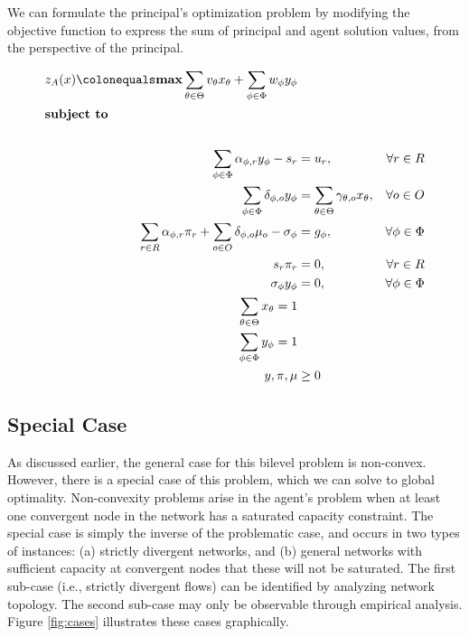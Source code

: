 We can formulate the principal's optimization problem by modifying the objective function to express the sum of principal and agent solution values, from the perspective of the principal.

\begin{align} 
    z_A(x) \colonequals \boldsymbol{\max}  \sum_{\theta \in \Theta} v_{\theta} x_{\theta} + \sum_{\phi \in \Phi} w_{\phi} y_{\phi} \\
    \shortintertext{\textbf{subject to} \nonumber} \\
    \sum_{\phi \in \Phi} \alpha_{\phi,r} y_{\phi}  - s_r  & = u_r, & \forall r \in R \\
    \sum_{\phi \in \Phi} \delta_{\phi,o} y_{\phi} & = \sum_{\theta \in \Theta} \gamma_{\theta,o} x_{\theta} , & \forall o \in O \\
    \sum_{r \in R} \alpha_{\phi,r} \pi_r + \sum_{o \in O} \delta_{\phi,o} \mu_o - \sigma_\phi  & = g_{\phi} , & \forall \phi \in \Phi \\
     s_r \pi_r & = 0 , & \forall r \in R \\
    \sigma_{\phi} y_{\phi} & = 0 , & \forall \phi \in \Phi \\
    \sum_{\theta \in \Theta} x_\theta = 1 \\
    \sum_{\phi \in \Phi} y_\phi = 1 \\
    y, \pi, \mu & \geq 0 
\end{align}

\subsection{Special Case}

As discussed earlier, the general case for this bilevel problem is non-convex. 
However, there is a special case of this problem, which we can solve to global optimality. 
Non-convexity problems arise in the agent's problem when at least one convergent node in the network has a saturated capacity constraint. 
The special case is simply the inverse of the problematic case, and occurs in two types of instances: (a) strictly divergent networks, and (b) general networks with sufficient capacity at convergent nodes that these will not be saturated. 
The first sub-case (i.e., strictly divergent flows) can be identified by analyzing network topology. 
The second sub-case may only be observable through empirical analysis. 
Figure \ref{fig:cases} illustrates these cases graphically. 

